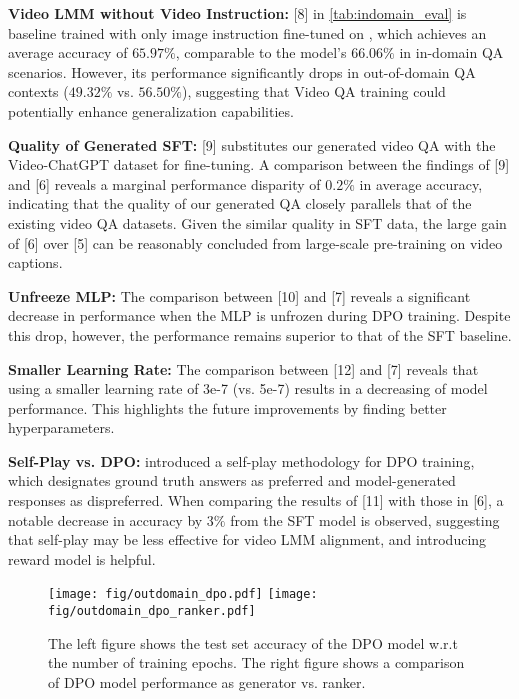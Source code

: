\textbf{Video LMM without Video Instruction:} [8] in \cref{tab:indomain_eval} is baseline trained with only image instruction fine-tuned on \modelpt, which achieves an average accuracy of $65.97\%$, comparable to the \modelsft model's $66.06\%$ in in-domain QA scenarios. However, its performance significantly drops in out-of-domain QA contexts ($49.32\%$ vs. $56.50\%$), suggesting that Video QA training could potentially enhance generalization capabilities. 

\textbf{Quality of Generated SFT:} [9] substitutes our generated video QA  with the Video-ChatGPT dataset for \videollava fine-tuning. A comparison between the findings of [9] and [6] reveals a marginal performance disparity of $0.2\%$ in average accuracy, indicating that the quality of our generated QA closely parallels that of the existing video QA datasets. Given the similar quality in SFT data, the large gain of [6] over [5] can be reasonably concluded from large-scale pre-training on video captions.

\textbf{Unfreeze MLP:} The comparison between [10] and [7] reveals a significant decrease in performance when the MLP is unfrozen during DPO training. Despite this drop, however, the performance remains superior to that of the SFT baseline.

\textbf{Smaller Learning Rate:} The comparison between [12] and [7] reveals that using a smaller learning rate of 3e-7 (vs. 5e-7) results in a decreasing of model performance. This highlights the future improvements by finding better hyperparameters.

\textbf{Self-Play vs. DPO:} \cite{chen2024self} introduced a self-play methodology for DPO training, which designates ground truth answers as preferred and model-generated responses as dispreferred. When comparing the results of [11] with those in [6], a notable decrease in accuracy by $3\%$ from the SFT model is observed, suggesting that self-play may be less effective for video LMM alignment, and introducing reward model is helpful.

\begin{figure}[ht]
\centering
\vspace{-0.6cm}
\texttt{[image: fig/outdomain\_dpo.pdf]} 
\texttt{[image: fig/outdomain\_dpo\_ranker.pdf]} 
\caption{The left figure shows the test set accuracy of the DPO model w.r.t the number of training epochs. The right figure shows a comparison of DPO model performance as generator vs. ranker.}
\label{fig:dpo_ablation}
\end{figure}

